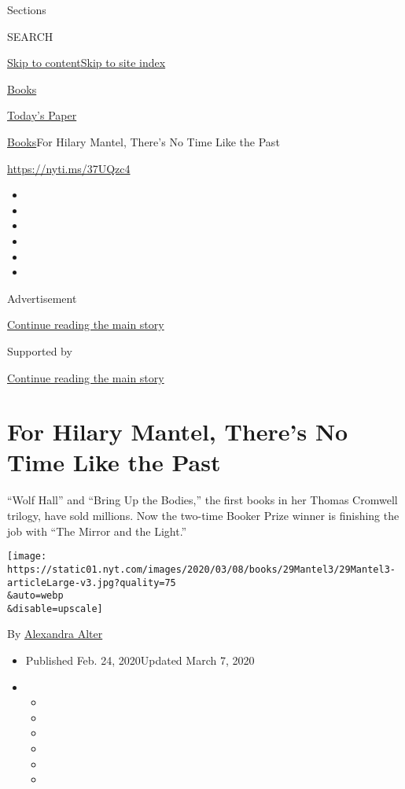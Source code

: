 Sections

SEARCH

\protect\hyperlink{site-content}{Skip to
content}\protect\hyperlink{site-index}{Skip to site index}

\href{https://www.nytimes.com/section/books}{Books}

\href{https://myaccount.nytimes.com/auth/login?response_type=cookie\&client_id=vi}{}

\href{https://www.nytimes.com/section/todayspaper}{Today's Paper}

\href{/section/books}{Books}\textbar{}For Hilary Mantel, There's No Time
Like the Past

\url{https://nyti.ms/37UQzc4}

\begin{itemize}
\item
\item
\item
\item
\item
\item
\end{itemize}

Advertisement

\protect\hyperlink{after-top}{Continue reading the main story}

Supported by

\protect\hyperlink{after-sponsor}{Continue reading the main story}

\hypertarget{for-hilary-mantel-theres-no-time-like-the-past}{%
\section{For Hilary Mantel, There's No Time Like the
Past}\label{for-hilary-mantel-theres-no-time-like-the-past}}

``Wolf Hall'' and ``Bring Up the Bodies,'' the first books in her Thomas
Cromwell trilogy, have sold millions. Now the two-time Booker Prize
winner is finishing the job with ``The Mirror and the Light.''

\texttt{[image: https://static01.nyt.com/images/2020/03/08/books/29Mantel3/29Mantel3-articleLarge-v3.jpg?quality=75\\\&auto=webp\\\&disable=upscale]}

By \href{https://www.nytimes.com/by/alexandra-alter}{Alexandra Alter}

\begin{itemize}
\item
  Published Feb. 24, 2020Updated March 7, 2020
\item
  \begin{itemize}
  \item
  \item
  \item
  \item
  \item
  \item
  \end{itemize}
\end{itemize}

